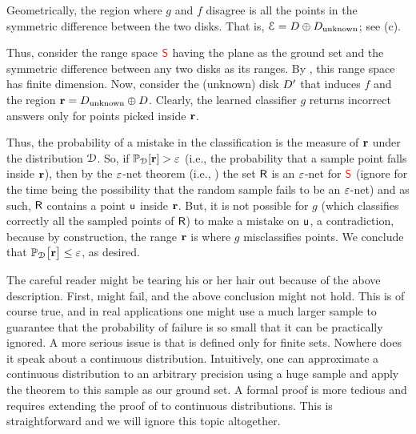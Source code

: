 
Geometrically, the region where $g$ and $f$ disagree is all the points
in the symmetric difference between the two disks. That is, $\EuScript{E} =
D \oplus D_{\text{unknown}}$; see  (c).

Thus, consider the range space ${\textcolor{red}{\mathsf{S}}}$ having the plane as the
ground set and the symmetric difference between any two disks as its
ranges. By , this range space has finite \VC{}
dimension. Now, consider the (unknown) disk $D'$ that induces $f$
and the region $\mathbf{r} = D_\text{unknown} \oplus D$. Clearly,
the learned classifier $g$ returns incorrect answers only for points
picked inside $\mathbf{r}$.


Thus, the probability of a mistake in the classification is the
measure of $\mathbf{r}$ under the distribution $\EuScript{D}$. So, if
$\mathbb{P}_{\EuScript{D}} [ \mathbf{r} ] > {\varepsilon}$ (i.e., the probability that
a sample point falls inside $\mathbf{r}$), then by the ${\varepsilon}$-net theorem
(i.e., ) the set $\mathsf{R}$ is an ${\varepsilon}$-net for
${\textcolor{red}{\mathsf{S}}}$ (ignore for the time being the possibility that the
random sample  fails to be an ${\varepsilon}$-net) and as
such, $\mathsf{R}$ contains a point $\mathsf{u}$ inside $\mathbf{r}$. But, it is
not possible for $g$ (which classifies correctly all the sampled
points of $\mathsf{R}$) to make a mistake on $\mathsf{u}$, a contradiction,
because by construction, the range $\mathbf{r}$ is where $g$ misclassifies
points. We conclude that
$\mathbb{P}_{\EuScript{D}}\, \!\!\left[ { \mathbf{r} } \bigr. \right] \leq {\varepsilon}$, as desired.

  The careful reader might be tearing his or
her hair out because of the above description. First,
 might fail, and the above conclusion might not
hold. This is of course true, and in real applications one might use a
much larger sample to guarantee that the probability of failure is so
small that it can be practically ignored.  A more serious issue is
that  is defined only for finite sets. Nowhere
does it speak about a continuous distribution.  Intuitively, one can
approximate a continuous distribution to an arbitrary precision using
a huge sample and apply the theorem to this sample as our ground
set. A formal proof is more tedious and requires extending the proof
of  to continuous distributions. This is
straightforward and we will ignore this topic altogether.


